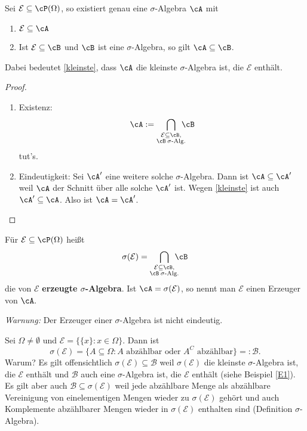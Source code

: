 \begin{korollar}
	Sei $\mathcal E \subseteq \cP (\Omega)$, so existiert genau eine $\sigma$-Algebra $\cA$ mit
	\begin{enumerate}[label=(\roman*)]
		\item $\mathcal E \subseteq \cA$
		\item \label{kleinste} Ist $\mathcal E \subseteq \cB$ und $\cB$ ist eine $\sigma$-Algebra, so gilt $\cA \subseteq \cB$.
	\end{enumerate}
	Dabei bedeutet \ref{kleinste}, dass $\cA$ die kleinste $\sigma$-Algebra ist, die $\mathcal E$ enthält.
\end{korollar}

\begin{proof}\abs
	\begin{enumerate}[label=(\roman*)]
		\item Existenz: \[ \cA := \bigcap\limits_{\substack{\mathcal E \subseteq \cB, \\ \cB \: \sigma \text{-Alg.}}} \! \! \! \! \cB  \]
		tut's.
		\item Eindeutigkeit: Sei $\cA'$ eine weitere solche $\sigma$-Algebra. Dann ist $\cA \subseteq \cA'$ weil $\cA $ der Schnitt über alle solche $\cA'$ ist. Wegen \ref{kleinste} ist auch $\cA' \subseteq \cA$. Also ist $\cA = \cA'$.
	\end{enumerate}
\end{proof}

\begin{deff}
	Für $\mathcal E \subseteq \cP(\Omega)$ heißt  \[\sigma (\mathcal E) = \bigcap\limits_{\substack{\mathcal E \subseteq \cB, \\ \cB \: \sigma \text{-Alg.}}} \! \! \! \! \cB \] die von $\mathcal E$ \textbf{erzeugte $\sigma$-Algebra}. Ist $\cA = \sigma(\mathcal E)$, so nennt man $\mathcal E$ einen Erzeuger von $\cA.$
	
\textit{Warnung:} Der Erzeuger einer $\sigma$-Algebra ist nicht eindeutig.
\end{deff}

\begin{beispiel}
	Sei $\Omega \neq \emptyset$ und $\mathcal E=\{ \{ x \} \! : x\in \Omega \}$. Dann ist \[ \sigma(\mathcal E)= \{ A \subseteq \Omega \! : \text{$A$ abzählbar oder $A^C$ abzählbar}\}=:\mathcal B . \]
	Warum? Es gilt offensichtlich $\sigma(\mathcal E) \subseteq \mathcal B$ weil $\sigma(\mathcal E)$ die kleinste $\sigma$-Algebra ist, die $\mathcal E$ enth\"alt und $\mathcal B$ auch eine $\sigma$-Algebra ist, die $\mathcal E$ enth\"alt (siehe Beispiel \ref{E1}). Es gilt aber auch $\mathcal B \subseteq \sigma(\mathcal E)$ weil jede abzählbare Menge als abzählbare Vereinigung von einelementigen Mengen wieder zu $\sigma(\mathcal E)$ gehört und auch Komplemente abzählbarer Mengen wieder in $\sigma(\mathcal E)$ enthalten sind (Definition $\sigma$-Algebra).
\end{beispiel}

